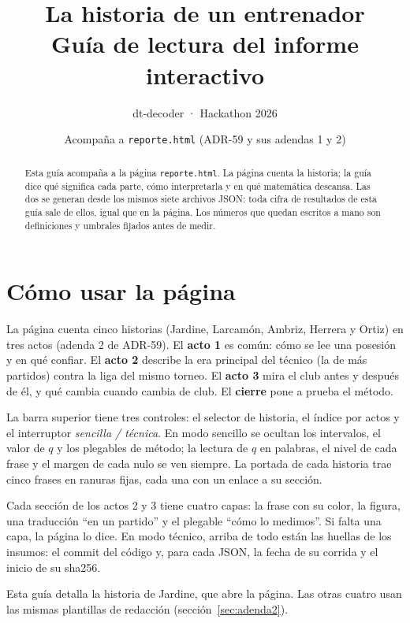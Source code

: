 \documentclass[11pt,a4paper]{article}
\title{\textbf{La historia de un entrenador}\\[0.3em]\large Guía de lectura del informe interactivo}
\author{dt-decoder · Hackathon 2026}
\date{Acompaña a \texttt{reporte.html} (ADR-59 y sus adendas 1 y 2)}
\begin{document}
\maketitle
\thispagestyle{empty}

\begin{abstract}
\noindent Esta guía acompaña a la página \texttt{reporte.html}. La página cuenta la
historia; la guía dice qué significa cada parte, cómo interpretarla y en qué
matemática descansa. Las dos se generan desde los mismos siete archivos JSON:
toda cifra de resultados de esta guía sale de ellos, igual que en la página. Los
números que quedan escritos a mano son definiciones y umbrales fijados antes de medir.
\end{abstract}

\tableofcontents
\newpage

\section{Cómo usar la página}

La página cuenta cinco historias (Jardine, Larcamón, Ambriz, Herrera y Ortiz)
en tres actos (adenda 2 de ADR-59). El \textbf{acto 1} es común: cómo se lee
una posesión y en qué confiar. El \textbf{acto 2} describe la era principal del
técnico (la de más partidos) contra la liga del mismo torneo. El \textbf{acto 3}
mira el club antes y después de él, y qué cambia cuando cambia de club. El
\textbf{cierre} pone a prueba el método.

La barra superior tiene tres controles: el selector de historia, el índice por
actos y el interruptor \emph{sencilla / técnica}. En modo sencillo se ocultan
los intervalos, el valor de $q$ y los plegables de método; la lectura de $q$ en
palabras, el nivel de cada frase y el margen de cada nulo se ven siempre. La
portada de cada historia trae cinco frases en ranuras fijas, cada una con un
enlace a su sección.

Cada sección de los actos 2 y 3 tiene cuatro capas: la frase con su color, la
figura, una traducción ``en un partido'' y el plegable ``cómo lo medimos''. Si
falta una capa, la página lo dice. En modo técnico, arriba de todo están las
huellas de los insumos: el commit del código y, para cada JSON, la fecha de su
corrida y el inicio de su sha256.

Esta guía detalla la historia de Jardine, que abre la página. Las otras cuatro
usan las mismas plantillas de redacción (sección~\ref{sec:adenda2}).
\end{document}

